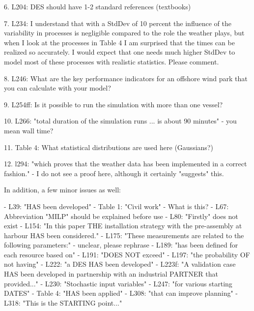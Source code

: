 6. L204: DES should have 1-2 standard references (textbooks)

7. L234: I understand that with a StdDev of 10 percent the influence of the variability in processes is negligible compared to the role the weather plays, but when I look at the processes in Table 4 I am surprised that the times can be realized so accurately. I would expect that one needs much higher StdDev to model most of these processes with realistic statistics. Please comment.

8. L246: What are the key performance indicators for an offshore wind park that you can calculate with your model?

9. L254ff: Is it possible to run the simulation with more than one vessel?

10. L266: "total duration of the simulation runs ... is about 90 minutes" - you mean wall time?

11. Table 4: What statistical distributions are used here (Gaussians?)

12. l294: "which proves that the weather data has been implemented in a correct fashion." - I do not see a proof here, although it certainly "suggests" this.


In addition, a few minor issues as well:

- L39: "HAS been developed"
- Table 1: "Civil work" - What is this?
- L67: Abbreviation "MILP" should be explained before use
- L80: "Firstly" does not exist
- L154: "In this paper THE installation strategy with the pre-assembly at harbour HAS been considered."
- L175: "These measurements are related to the following parameters:" - unclear, please rephrase
- L189: "has been defined for each resource based on"
- L191: "DOES NOT exceed"
- L197: "the probability OF not having"
- L222: "a DES HAS been developed"
- L223f: "A validation case HAS been developed in partnership with an industrial PARTNER that provided..."
- L230: "Stochastic input variables"
- L247: "for various starting DATES"
- Table 4: "HAS been applied"
- L308: "that can improve planning"
- L318: "This is the STARTING point..."
